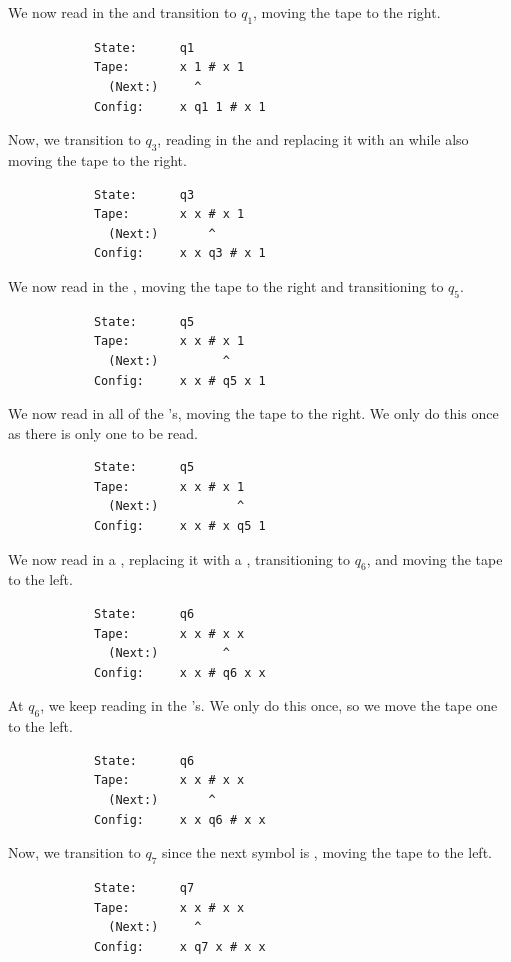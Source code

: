 \documentclass[letterpaper]{article}
\begin{document}
\begin{enumerate}
\begin{mdframed}[]
        We now read in the  and transition to $q_1$, moving the tape to the right. 
        \begin{verbatim}
            State:      q1
            Tape:       x 1 # x 1
              (Next:)     ^
            Config:     x q1 1 # x 1
        \end{verbatim}

        Now, we transition to $q_3$, reading in the  and replacing it with an  while also moving the tape to the right. 
        \begin{verbatim}
            State:      q3
            Tape:       x x # x 1
              (Next:)       ^
            Config:     x x q3 # x 1
        \end{verbatim}

        We now read in the \code{\#}, moving the tape to the right and transitioning to $q_5$.
        \begin{verbatim}
            State:      q5
            Tape:       x x # x 1
              (Next:)         ^
            Config:     x x # q5 x 1
        \end{verbatim}

        We now read in all of the 's, moving the tape to the right. We only do this once as there is only one  to be read. 
        \begin{verbatim}
            State:      q5
            Tape:       x x # x 1
              (Next:)           ^
            Config:     x x # x q5 1
        \end{verbatim}

        We now read in a , replacing it with a , transitioning to $q_6$, and moving the tape to the left. 
        \begin{verbatim}
            State:      q6
            Tape:       x x # x x
              (Next:)         ^
            Config:     x x # q6 x x
        \end{verbatim}

        At $q_6$, we keep reading in the 's. We only do this once, so we move the tape one to the left. 
        \begin{verbatim}
            State:      q6
            Tape:       x x # x x
              (Next:)       ^
            Config:     x x q6 # x x
        \end{verbatim}

        Now, we transition to $q_7$ since the next symbol is \code{\#}, moving the tape to the left. 
        \begin{verbatim}
            State:      q7
            Tape:       x x # x x
              (Next:)     ^
            Config:     x q7 x # x x
        \end{verbatim}


\end{mdframed}
\end{enumerate}
\end{document}
